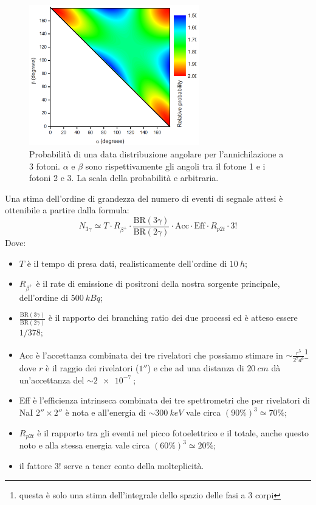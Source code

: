 \begin{figure}[h]
	\centering
	\includegraphics[width=20em]{immagini/3gamma_distribution}
	\caption{\label{fig:3gamma_angular_distr}Probabilità di una data distribuzione angolare per l'annichilazione a 3 fotoni. $\alpha$ e $\beta$ sono rispettivamente gli angoli tra il fotone 1 e i fotoni 2 e 3. La scala della probabilità e arbitraria.}
\end{figure}

Una stima dell'ordine di grandezza del numero di eventi di segnale attesi è ottenibile a partire dalla formula:
\begin{equation}
\label{eq:stima_3gamma}
N_{3\gamma} \simeq T \cdot R_{\beta^+} \cdot \frac{\text{BR}(3\gamma)}{\text{BR}(2\gamma)} \cdot \text{Acc} \cdot \text{Eff} \cdot R_{p2t} \cdot 3!
\end{equation}
Dove:
\begin{itemize}
	\item $T$ è il tempo di presa dati, realisticamente dell'ordine di $\SI{10}{h}$;
	\item $R_{\beta^+}$ è il rate di emissione di positroni della nostra sorgente principale, dell'ordine di $\SI{500}{kBq}$;
	\item $\frac{\text{BR}(3\gamma)}{\text{BR}(2\gamma)}$ è il rapporto dei branching ratio dei due processi ed è atteso essere $1/378$;
	\item Acc è l'accettanza combinata dei tre rivelatori che possiamo stimare in $\sim \frac{r^5}{2^7 d^5}$\footnote{questa è solo una stima dell'integrale dello spazio delle fasi a 3 corpi} dove $r$ è il raggio dei rivelatori ($1''$) e che ad una distanza di $\SI{20}{cm}$ dà un'accettanza del $\sim\SI{2e-7}{}$;
	\item Eff è l'efficienza intrinseca combinata dei tre spettrometri che per rivelatori di NaI $2''\times2''$ è nota \cite{knoll} e all'energia di $\sim \SI{300}{keV}$ vale circa $(90\%)^3 \simeq  70\%$;
	\item $R_{p2t}$ è il rapporto tra gli eventi nel picco fotoelettrico e il totale, anche questo noto \cite{knoll} e alla stessa energia vale circa $(60\%)^3 \simeq 20\%$;
	\item il fattore $3!$ serve a tener conto della molteplicità.
\end{itemize}
